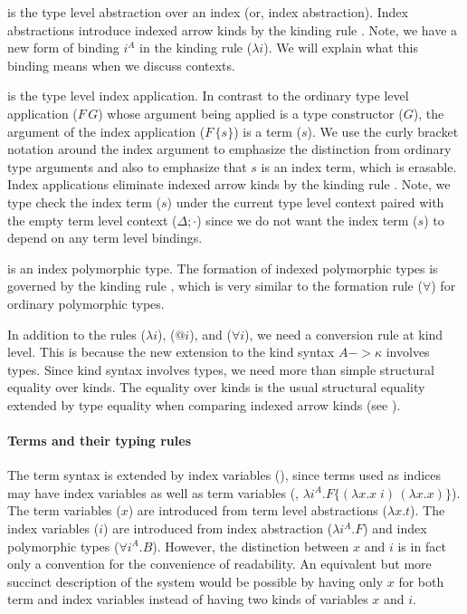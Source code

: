  is the type level abstraction over an index
(or, index abstraction). Index abstractions introduce indexed arrow kinds
by the kinding rule . Note, we have a new form of binding
$i^A$ in the kinding rule ($\lambda i$).
We will explain what this binding means when we discuss contexts.

 is the type level index application. In contrast to
the ordinary type level application ($F\,G$) whose argument being applied is
a type constructor ($G$), the argument of the index application ($F\,\{s\}$) is
a term ($s$). We use the curly bracket notation around the index argument to
emphasize the distinction from ordinary type arguments and also to emphasize
that $s$ is an index term, which is erasable. Index applications eliminate
indexed arrow kinds by the kinding rule . Note, we type check
the index term ($s$) under the current type level context paired with
the empty term level context ($\Delta;\cdot$) since we do not want
the index term ($s$) to depend on any term level bindings.

 is an index polymorphic type.
The formation of indexed polymorphic types is governed by
the kinding rule , which is very similar to
the formation rule ($\forall$) for ordinary polymorphic types.

In addition to the rules ($\lambda i$), ($@ i$), and ($\forall i$),
we need a conversion rule  at kind level. This is because
the new extension to the kind syntax $A -> \kappa$ involves types.
Since kind syntax involves types, we need more than simple structural
equality over kinds. The equality over kinds is the usual structural
equality extended by type equality when comparing indexed arrow kinds
(see ).

\paragraph{Terms and their typing rules}
The term syntax is extended by index variables (), since terms used
as indices may have index variables as well as term variables
(\eg, $\lambda i^A.F\{(\lambda x.x\;i)\,(\lambda x.x)\}$).
The term variables ($x$) are introduced from
term level abstractions ($\lambda x.t$).
The index variables ($i$) are introduced from
index abstraction ($\lambda i^A.F$) and
index polymorphic types ($\forall i^A.B$). However, the distinction between
$x$ and $i$ is in fact only a convention for the convenience of readability.
An equivalent but more succinct description of the system would be possible
by having only $x$ for both term and index variables instead of having two
kinds of variables $x$ and $i$.

